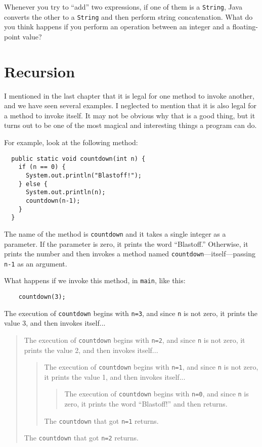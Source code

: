 \documentclass[12pt]{book}
\theoremstyle{definition}
\begin{document}
Whenever you try to ``add'' two
expressions, if one of them is a {\tt String}, Java converts the
other to a {\tt String} and then perform string concatenation.  What do you
think happens if you perform an operation between an integer and a
floating-point value?


\section{Recursion}
\label{recursion}

I mentioned in the last chapter that it is legal for one method to
invoke another, and we have seen several examples.  I neglected to
mention that it is also legal for a method to invoke itself.  It may
not be obvious why that is a good thing, but it turns out to be one of
the most magical and interesting things a program can do.

For example, look at the following method:

\begin{lstlisting}
  public static void countdown(int n) {
    if (n == 0) {
      System.out.println("Blastoff!");
    } else {
      System.out.println(n);
      countdown(n-1);
    }
  }
\end{lstlisting}
%
The name of the method is {\tt countdown} and it takes a single
integer as a parameter.  If the parameter is zero, it prints
the word ``Blastoff.''  Otherwise, it prints the number and
then invokes a method named {\tt countdown}---itself---passing
{\tt n-1} as an argument.

What happens if we invoke this method, in {\tt main}, like
this:

\begin{lstlisting}
    countdown(3);
\end{lstlisting}
%
The execution of {\tt countdown} begins with {\tt n=3}, and
since {\tt n} is not zero, it prints the value 3, and then
invokes itself...

\begin{quote}
The execution of {\tt countdown} begins with {\tt n=2}, and
since {\tt n} is not zero, it prints the value 2, and then
invokes itself...

\begin{quote}
The execution of {\tt countdown} begins with {\tt n=1}, and
since {\tt n} is not zero, it prints the value 1, and then
invokes itself...

\begin{quote}
The execution of {\tt countdown} begins with {\tt n=0}, and
since {\tt n} is zero, it prints the word ``Blastoff!''
and then returns.
\end{quote}

The {\tt countdown} that got {\tt n=1} returns.

\end{quote}

The {\tt countdown} that got {\tt n=2} returns.

\end{quote}
\end{document}
